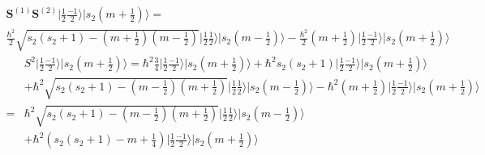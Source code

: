 \begin{enumerate}
        \begin{align*}
            \bm S^{(1)}\bm S^{(2)}\bigg|\frac{1}{2}\frac{-1}{2}\bigg\rangle
            \bigg|s_2\left(m+\frac{1}{2}\right)\bigg\rangle
            =&\\
            \frac{\hbar^2}{2}\sqrt{s_2(s_2+1)-(m+\frac{1}{2})(m-\frac{1}{2})}\bigg|\frac{1}{2}\frac{1}{2}\bigg\rangle
            \bigg|s_2\left(m-\frac{1}{2}\right)\bigg\rangle
            -
            \frac{\hbar^2}{2}
            \left(m+\frac{1}{2}\right)
            \bigg|\frac{1}{2}\frac{-1}{2}\bigg\rangle
            \bigg|s_2\left(m+\frac{1}{2}\right)\bigg\rangle
        \end{align*}
        \begin{align*}
            &S^2\bigg|\frac{1}{2}\frac{-1}{2}\bigg\rangle
            \bigg|s_2\left(m+\frac{1}{2}\right)\bigg\rangle
            =\hbar^2\frac{3}{4}\bigg|\frac{1}{2}\frac{-1}{2}\bigg\rangle
            \bigg|s_2\left(m+\frac{1}{2}\right)\bigg\rangle
            +
            \hbar^2s_2(s_2+1)\bigg|\frac{1}{2}\frac{-1}{2}\bigg\rangle
            \bigg|s_2\left(m+\frac{1}{2}\right)\bigg\rangle\\
            &+\hbar^2\sqrt{s_2(s_2+1)-(m-\frac{1}{2})(m+\frac{1}{2})}\bigg|\frac{1}{2}\frac{1}{2}\bigg\rangle
            \bigg|s_2\left(m-\frac{1}{2}\right)\bigg\rangle
            -
            \hbar^2
            \left(m+\frac{1}{2}\right)
            \bigg|\frac{1}{2}\frac{-1}{2}\bigg\rangle
            \bigg|s_2\left(m+\frac{1}{2}\right)\bigg\rangle\\
            =&\hbar^2\sqrt{s_2(s_2+1)-(m-\frac{1}{2})(m+\frac{1}{2})}\bigg|\frac{1}{2}\frac{1}{2}\bigg\rangle
            \bigg|s_2\left(m-\frac{1}{2}\right)\bigg\rangle\\
            &+
            \hbar^2(s_2(s_2+1)-m+\frac{1}{4})
            \bigg|\frac{1}{2}\frac{-1}{2}\bigg\rangle
            \bigg|s_2\left(m+\frac{1}{2}\right)\bigg\rangle
        \end{align*}
        

\end{enumerate}
